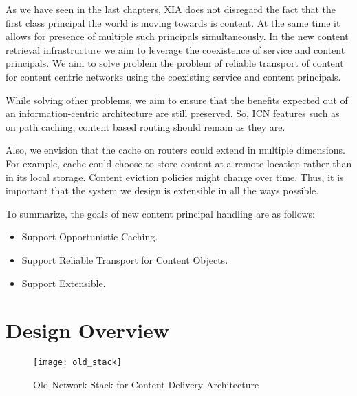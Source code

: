 As we have seen in the last chapters, XIA does not disregard the fact
that the first class principal the world is moving towards is
content. At the same time it allows for presence of multiple such
principals simultaneously. In the new content retrieval infrastructure
we aim to leverage the coexistence of service and content
principals. We aim to solve problem the problem of reliable transport
of content for content centric networks using the coexisting service
and content principals.

While solving other problems, we aim to ensure that the benefits
expected out of an information-centric architecture are still
preserved. So, ICN features such as on path caching, content based
routing should remain as they are.

Also, we envision that the cache on routers could extend in multiple
dimensions. For example, cache could choose to store content at a
remote location rather than in its local storage. Content eviction
policies might change over time.  Thus, it is important that the
system we design is extensible in all the ways possible.

To summarize, the goals of new content principal handling are as
follows:
\begin{itemize}
\item{Support Opportunistic Caching.}
\item{Support Reliable Transport for Content Objects.}
\item{Support Extensible.}
\end{itemize}
\section{Design Overview}

\begin{figure}
  \begin{center}
    \texttt{[image: old\_stack]}
    \caption{Old Network Stack for Content Delivery Architecture}
    \label{fig:old_stack}
  \end{center}
\end{figure}

